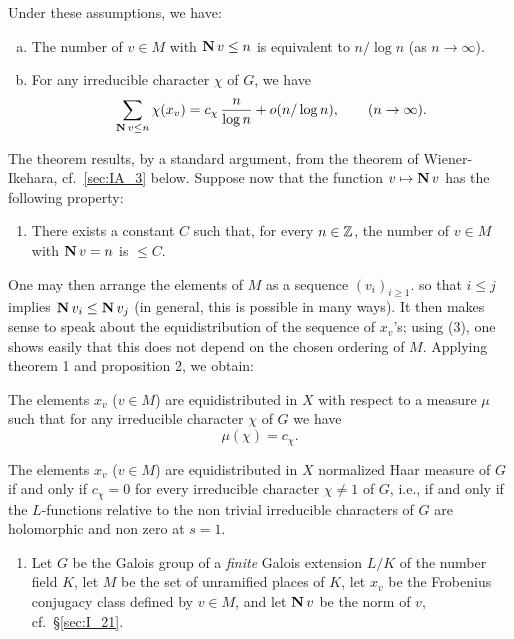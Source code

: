 \begin{subappendices}
Under these assumptions, we have:
\begin{thm}
\begin{enumerate}[(a)]
\item The number of $v \in M$ with $\operatorname{\mathbf{N}} v \le n$ is equivalent to $n/\log
	n$ (as $n \to \infty$).
\item For any irreducible character $\chi$ of $G$, we have
	$$ \sum_{\operatorname{\mathbf{N}} v\le n} \chi(x_v) = c_\chi \, \frac{n}{\log n} +
	o(n/\log n), \qquad (n \to \infty). $$
\end{enumerate}
\end{thm}
The theorem results, by a standard argument, from the theorem of
Wiener-Ikehara, cf.\ \ref{sec:IA_3} below.
Suppose now that the function $v \mapsto \operatorname{\mathbf{N}} v$ has the following
property:

\begin{enumerate}[resume*=Lfunc_hyp]
\item\dpage
	There exists a constant $C$ such that, for every $n \in \mathbb{Z}$, the number
	of $v \in M$ with $\operatorname{\mathbf{N}} v = n$ is $\le C$.
\end{enumerate}
One may then arrange the elements of $M$ as a sequence
$(v_i)_{i\ge 1}$. so that $i \le j$ implies $\operatorname{\mathbf{N}} v_i \le \operatorname{\mathbf{N}} v_j$ (in
general, this is possible in many ways). It then makes sense to speak about the
equidistribution of the sequence of $x_v$'s; using (3), one shows easily that
this does not depend on the chosen ordering of $M$. Applying theorem 1 and
proposition 2, we obtain:
\begin{thm}
The elements $x_v$ ($v \in M$) are equidistributed in $X$
with respect to a measure $\mu$ such that for any irreducible character
$\chi$ of $G$ we have
$$ \mu(\chi) = c_\chi. $$
\end{thm}
\begin{cor}
	The elements $x_v$ ($v \in M$) are equidistributed in $X$
	normalized Haar measure of $G$ if and only if $c_\chi = 0$ for every
	irreducible character $\chi \ne 1$ of $G$, i.e., if and only if the
	$L$-functions relative to the non trivial irreducible characters of $G$
	are holomorphic and non zero at $s = 1$.
\end{cor}

\begin{ex}
\begin{enumerate}[series=ex_IA3]
\item Let $G$ be the Galois group of a \emph{finite} Galois extension
	$L/K$ of the number field $K$, let $M$ be the set of unramified places
	of $K$, let $x_v$ be the Frobenius conjugacy class defined by $v \in M$,
	and let $\operatorname{\mathbf{N}} v$ be the norm of $v$, cf.\ \S\ref{sec:I_21}.


\end{enumerate}
\end{ex}
\end{subappendices}
